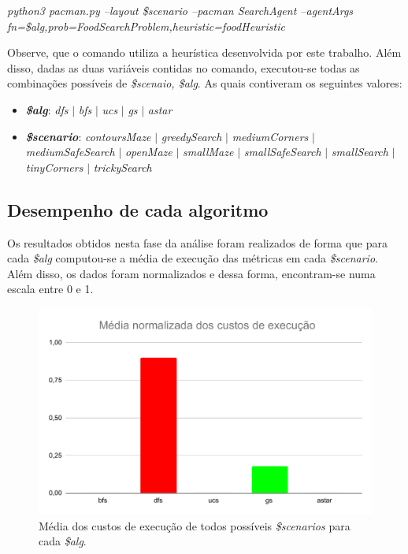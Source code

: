 \documentclass[12pt]{article}
\begin{document}
\begin{center}
  \textit{python3 pacman.py --layout \$scenario --pacman SearchAgent --agentArgs fn=\$alg,prob=FoodSearchProblem,heuristic=foodHeuristic}
\end{center}

Observe, que o comando utiliza a heurística desenvolvida por este trabalho.
Além disso, dadas as duas variáveis contidas no comando, executou-se todas as
combinações possíveis de \textit{\$scenaio, \$alg}.
As quais contiveram os seguintes valores:
\begin{itemize}
  \item \textbf{\textit{\$alg}}: \textit{dfs} $|$ \textit{bfs} $|$ \textit{ucs} $|$ \textit{gs}
  $|$ \textit{astar}
  \item \textbf{\textit{\$scenario}}: \textit{contoursMaze} $|$ \textit{greedySearch} $|$
  \textit{mediumCorners} $|$ \textit{mediumSafeSearch} $|$ \textit{openMaze} $|$
  \textit{smallMaze} $|$ \textit{smallSafeSearch} $|$ \textit{smallSearch} $|$
  \textit{tinyCorners} $|$ \textit{trickySearch}
\end{itemize}

\subsection{Desempenho de cada algoritmo}
Os resultados obtidos nesta fase da análise foram realizados de forma que
para cada \textit{\$alg} computou-se a média de execução das métricas em cada
\textit{\$scenario}.
Além disso, os dados foram normalizados e dessa forma, encontram-se numa escala
entre 0 e 1.

\begin{figure}[hbt!]
  \centering
  \includegraphics[width=.8\textwidth]{fig/custo.pdf}
  \caption{Média dos custos de execução de todos possíveis \textit{\$scenarios} para cada \textit{\$alg}.}
  \label{fig:custo}
\end{figure}
\end{document}
